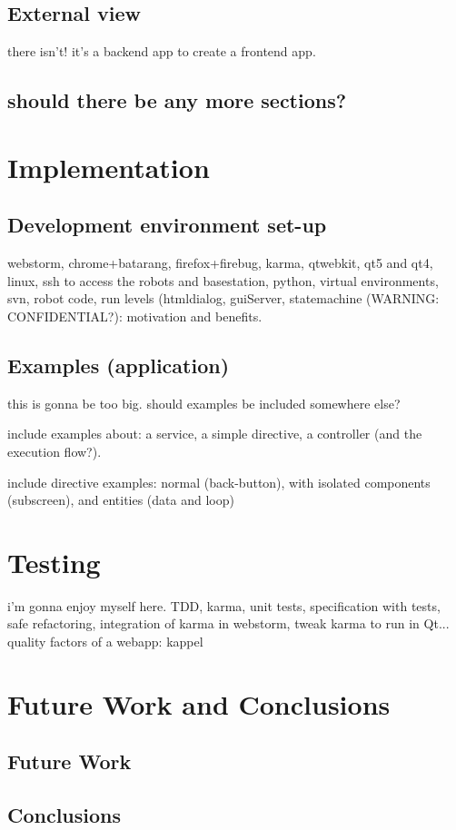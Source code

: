 \section{External view}
there isn't! it's a backend app to create a frontend app.

\section{should there be any more sections?}

\chapter{Implementation}
\section{Development environment set-up}
webstorm, chrome+batarang, firefox+firebug, karma, qtwebkit, qt5 and qt4, linux, ssh to access the robots and basestation, python, virtual environments, svn, robot code, run levels (htmldialog, guiServer, statemachine (WARNING: CONFIDENTIAL?): motivation and benefits.

\section{Examples (application)}
this is gonna be too big. should examples be included somewhere else?

include examples about: a service, a simple directive, a controller (and the execution flow?).

include directive examples: normal (back-button), with isolated components (subscreen), and entities (data and loop)

\chapter{Testing}
i'm gonna enjoy myself here.
TDD, karma, unit tests, specification with tests, safe refactoring, integration of karma in webstorm, tweak karma to run in Qt...
quality factors of a webapp: kappel


\chapter{Future Work and Conclusions}
\section{Future Work}
\section{Conclusions}